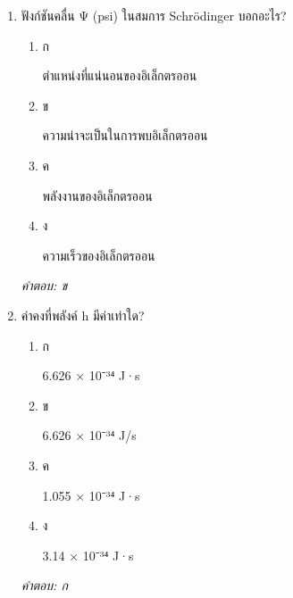 \documentclass[12pt]{article}
\begin{document}
\begin{enumerate}[label=\arabic*., itemsep=0.5\baselineskip, topsep=0.5\baselineskip, leftmargin=*]
\item ฟังก์ชันคลื่น Ψ (psi) ในสมการ Schrödinger บอกอะไร?
\begin{enumerate}[label=\alph*)., itemsep=0.3\baselineskip, topsep=0.3\baselineskip]
\item ก\ 
\begin{minipage}[t]{0.9\linewidth}
\raggedright ตำแหน่งที่แน่นอนของอิเล็กตรออน
\end{minipage}
\item ข\ 
\begin{minipage}[t]{0.9\linewidth}
\raggedright ความน่าจะเป็นในการพบอิเล็กตรออน
\end{minipage}
\item ค\ 
\begin{minipage}[t]{0.9\linewidth}
\raggedright พลังงานของอิเล็กตรออน
\end{minipage}
\item ง\ 
\begin{minipage}[t]{0.9\linewidth}
\raggedright ความเร็วของอิเล็กตรออน
\end{minipage}
\end{enumerate}
\vspace{-0.3\baselineskip}
\begin{small}
\textit{คำตอบ: ข}
\end{small}

\item ค่าคงที่พลังค์ h มีค่าเท่าใด?
\begin{enumerate}[label=\alph*)., itemsep=0.3\baselineskip, topsep=0.3\baselineskip]
\item ก\ 
\begin{minipage}[t]{0.9\linewidth}
\raggedright 6.626 × 10⁻³⁴ J·s
\end{minipage}
\item ข\ 
\begin{minipage}[t]{0.9\linewidth}
\raggedright 6.626 × 10⁻³⁴ J/s
\end{minipage}
\item ค\ 
\begin{minipage}[t]{0.9\linewidth}
\raggedright 1.055 × 10⁻³⁴ J·s
\end{minipage}
\item ง\ 
\begin{minipage}[t]{0.9\linewidth}
\raggedright 3.14 × 10⁻³⁴ J·s
\end{minipage}
\end{enumerate}
\vspace{-0.3\baselineskip}
\begin{small}
\textit{คำตอบ: ก}
\end{small}


\end{enumerate}
\end{document}
